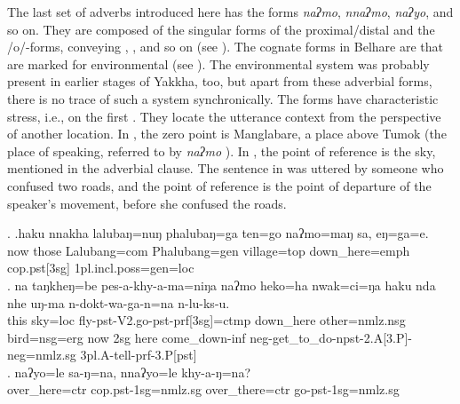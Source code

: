 The last set of adverbs introduced here has  the forms \emph{naʔmo}, \emph{nnaʔmo}, \emph{naʔyo}, and so on. They are composed of the singular forms of the proximal/distal  and the /o/-forms, conveying , ,  and so on (see ).  The cognate forms in Belhare are  that are marked for environmental  (see \citealt[226--27]{Bickel2001Deictic}). The environmental  system was probably present in earlier stages of Yakkha, too, but apart from these adverbial forms, there is no trace of such a system synchronically. The forms have characteristic stress, i.e., on the first . They locate the utterance context from the perspective of another location. In \Next[a], the zero point is Manglabare, a place above Tumok (the place of speaking, referred to by \emph{naʔmo} ). In \Next[b], the point of reference is the sky, mentioned in the adverbial clause.  The sentence in \Next[c] was uttered by someone who confused two roads, and the point of reference is the point of departure of the speaker's movement, before she confused the roads.

\ex. \ag.haku nnakha lalubaŋ=nuŋ   phalubaŋ=ga    ten=go         naʔmo=maŋ      sa,     eŋ=ga=e.\\
now those Lalubang{\sc =com} Phalubang{\sc =gen} village{\sc =top} down\_here{\sc =emph} {\sc cop.pst[3sg]} {\sc 1pl.incl.poss=gen=loc}\\
 
\bg. na   taŋkheŋ=be    pes-a-khy-a-ma=niŋa naʔmo heko=ha nwak=ci=ŋa haku nda nhe uŋ-ma n-dokt-wa-ga-n=na n-lu-ks-u.\\
	this sky{\sc =loc} fly{\sc -pst-V2.go-pst-prf[3sg]=ctmp} down\_here other{\sc =nmlz.nsg} bird{\sc =nsg=erg}	now {\sc 2sg} here come\_down{\sc -inf} {\sc neg-}get\_to\_do{\sc -npst-2.A[3.P]-neg=nmlz.sg} 	{\sc 3pl.A}-tell-{\sc prf-3.P[pst]}\\
	 
\bg.	naʔyo=le             sa-ŋ=na,                 nnaʔyo=le             khy-a-ŋ=na?\\
over\_here{\sc =ctr} {\sc cop.pst-1sg=nmlz.sg} over\_there{\sc =ctr} go{\sc -pst-1sg=nmlz.sg}\\
 


